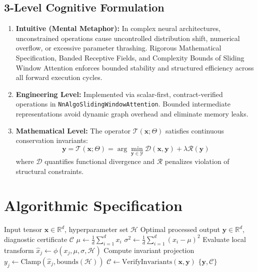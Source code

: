 \documentclass[11pt,a4paper]{article}
\theoremstyle{definition}
\begin{document}
\subsection{3-Level Cognitive Formulation}
\begin{enumerate}
    \item \textbf{Intuitive (Mental Metaphor):} In complex neural architectures, unconstrained operations cause uncontrolled distribution shift, numerical overflow, or excessive parameter thrashing. Rigorous Mathematical Specification, Banded Receptive Fields, and Complexity Bounds of Sliding Window Attention enforces bounded stability and structured efficiency across all forward execution cycles.
    \item \textbf{Engineering Level:} Implemented via scalar-first, contract-verified operations in \texttt{NnAlgoSlidingWindowAttention}. Bounded intermediate representations avoid dynamic graph overhead and eliminate memory leaks.
    \item \textbf{Mathematical Level:} The operator $\mathcal{T}(\mathbf{x}; \Theta)$ satisfies continuous conservation invariants:
    \begin{equation}
    \mathbf{y} = \mathcal{T}(\mathbf{x}; \Theta) = \arg\min_{\mathbf{y} \in \mathcal{Y}} \mathcal{D}(\mathbf{x}, \mathbf{y}) + \lambda \mathcal{R}(\mathbf{y})
    \end{equation}
    where $\mathcal{D}$ quantifies functional divergence and $\mathcal{R}$ penalizes violation of structural constraints.
\end{enumerate}

\section{Algorithmic Specification}

\begin{algorithm}[H]
\caption{Rigorous Mathematical Specification, Banded Receptive Fields, and Complexity Bounds of Sliding Window Attention Forward Pipeline}
\begin{algorithmic}[1]
\Require Input tensor $\mathbf{x} \in \mathbb{R}^d$, hyperparameter set $\mathcal{H}$
\Ensure Optimal processed output $\mathbf{y} \in \mathbb{R}^d$, diagnostic certificate $\mathcal{C}$
\State $\mu \gets \frac{1}{d} \sum_{i=1}^d x_i$
\State $\sigma^2 \gets \frac{1}{d} \sum_{i=1}^d (x_i - \mu)^2$
    \State Evaluate local transform $\hat{x}_j \gets \phi(x_j, \mu, \sigma, \mathcal{H})$
    \State Compute invariant projection $y_j \gets \text{Clamp}(\hat{x}_j, \text{bounds}(\mathcal{H}))$
\EndFor
\State $\mathcal{C} \gets \text{VerifyInvariants}(\mathbf{x}, \mathbf{y})$
\State \Return $\{\mathbf{y}, \mathcal{C}\}$
\end{algorithmic}
\end{algorithm}
\end{document}
